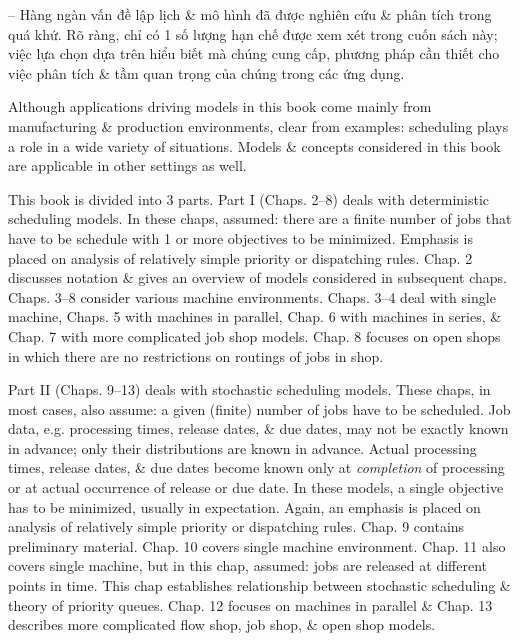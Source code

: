 \documentclass{article}
\begin{document}
\begin{itemize}
\begin{itemize}
        -- Hàng ngàn vấn đề lập lịch \& mô hình đã được nghiên cứu \& phân tích trong quá khứ. Rõ ràng, chỉ có 1 số lượng hạn chế được xem xét trong cuốn sách này; việc lựa chọn dựa trên hiểu biết mà chúng cung cấp, phương pháp cần thiết cho việc phân tích \& tầm quan trọng của chúng trong các ứng dụng.

        Although applications driving models in this book come mainly from manufacturing \& production environments, clear from examples: scheduling plays a role in a wide variety of situations. Models \& concepts considered in this book are applicable in other settings as well.

        This book is divided into 3 parts. Part I (Chaps. 2--8) deals with deterministic scheduling models. In these chaps, assumed: there are a finite number of jobs that have to be schedule with 1 or more objectives to be minimized. Emphasis is placed on analysis of relatively simple priority or dispatching rules. Chap. 2 discusses notation \& gives an overview of models considered in subsequent chaps. Chaps. 3--8 consider various machine environments. Chaps. 3--4 deal with single machine, Chaps. 5 with machines in parallel, Chap. 6 with machines in series, \& Chap. 7 with more complicated job shop models. Chap. 8 focuses on open shops in which there are no restrictions on routings of jobs in shop.

        Part II (Chaps. 9--13) deals with stochastic scheduling models. These chaps, in most cases, also assume: a given (finite) number of jobs have to be scheduled. Job data, e.g. processing times, release dates, \& due dates, may not be exactly known in advance; only their distributions are known in advance. Actual processing times, release dates, \& due dates become known only at {\it completion} of processing or at actual occurrence of release or due date. In these models, a single objective has to be minimized, usually in expectation. Again, an emphasis is placed on analysis of relatively simple priority or dispatching rules. Chap. 9 contains preliminary material. Chap. 10 covers single machine environment. Chap. 11 also covers single machine, but in this chap, assumed: jobs are released at different points in time. This chap establishes relationship between stochastic scheduling \& theory of priority queues. Chap. 12 focuses on machines in parallel \& Chap. 13 describes more complicated flow shop, job shop, \& open shop models.


\end{itemize}
\end{itemize}
\end{document}
